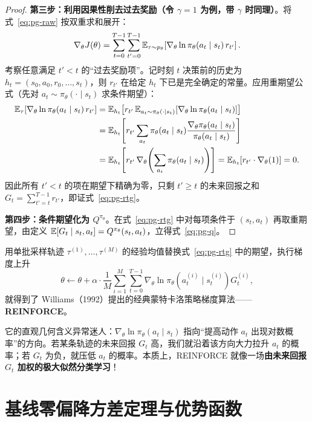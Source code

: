 \begin{thmBox}
\begin{proof}
\textbf{第三步：利用因果性削去过去奖励（令 $\gamma = 1$ 为例，带 $\gamma$ 时同理）}。将式~\eqref{eq:pg-raw} 按双重求和展开：
\[
  \nabla_\theta J(\theta) = \sum_{t=0}^{T-1} \sum_{t'=0}^{T-1} \mathbb{E}_{\tau \sim p_\theta}\!\left[\nabla_\theta \ln \pi_\theta(a_t \mid s_t)\, r_{t'}\right].
\]
考察任意满足 $t' < t$ 的“过去奖励项”。记时刻 $t$ 决策前的历史为 $h_t = (s_0, a_0, r_0, \dots, s_t)$，则 $r_{t'}$ 在给定 $h_t$ 下已是完全确定的常量。应用重期望公式（先对 $a_t \sim \pi_\theta(\cdot \mid s_t)$ 求条件期望）：
\begin{align*}
  \mathbb{E}_{\tau}\!\left[\nabla_\theta \ln \pi_\theta(a_t \mid s_t)\, r_{t'}\right]
  &= \mathbb{E}_{h_t}\!\left[r_{t'}\, \mathbb{E}_{a_t \sim \pi_\theta(\cdot \mid s_t)}\!\left[\nabla_\theta \ln \pi_\theta(a_t \mid s_t)\right]\right] \\
  &= \mathbb{E}_{h_t}\!\left[r_{t'} \sum_{a_t} \pi_\theta(a_t \mid s_t) \frac{\nabla_\theta \pi_\theta(a_t \mid s_t)}{\pi_\theta(a_t \mid s_t)}\right] \\
  &= \mathbb{E}_{h_t}\!\left[r_{t'}\, \nabla_\theta \!\left(\sum_{a_t} \pi_\theta(a_t \mid s_t)\right)\right]
   = \mathbb{E}_{h_t}\!\left[r_{t'} \cdot \nabla_\theta(1)\right] = 0.
\end{align*}
因此所有 $t' < t$ 的项在期望下精确为零，只剩 $t' \ge t$ 的未来回报之和 $G_t = \sum_{t'=t}^{T-1} r_{t'}$，即证式~\eqref{eq:pg-rtg}。

\textbf{第四步：条件期望化为 $Q^{\pi_\theta}$}。在式~\eqref{eq:pg-rtg} 中对每项条件于 $(s_t, a_t)$ 再取重期望，由定义 $\mathbb{E}[G_t \mid s_t, a_t] = Q^{\pi_\theta}(s_t, a_t)$，立得式~\eqref{eq:pg-q}。
\end{proof}
\end{thmBox}

用单批采样轨迹 $\tau^{(1)}, \dots, \tau^{(M)}$ 的经验均值替换式~\eqref{eq:pg-rtg} 中的期望，执行梯度上升
\[
  \theta \leftarrow \theta + \alpha \cdot \frac{1}{M}\sum_{i=1}^M \sum_{t=0}^{T-1} \nabla_\theta \ln \pi_\theta\!\left(a_t^{(i)} \mid s_t^{(i)}\right) G_t^{(i)},
\]
就得到了 Williams（1992）提出的经典蒙特卡洛策略梯度算法——\textbf{REINFORCE}。

它的直观几何含义异常迷人：$\nabla_\theta \ln \pi_\theta(a_t \mid s_t)$ 指向“提高动作 $a_t$ 出现对数概率”的方向。若某条轨迹的未来回报 $G_t$ 高，我们就沿着该方向大力拉升 $a_t$ 的概率；若 $G_t$ 为负，就压低 $a_t$ 的概率。本质上，REINFORCE 就像一场\textbf{由未来回报 $G_t$ 加权的极大似然分类学习}！

\section{基线零偏降方差定理与优势函数}
\label{sec:pg-baseline}

